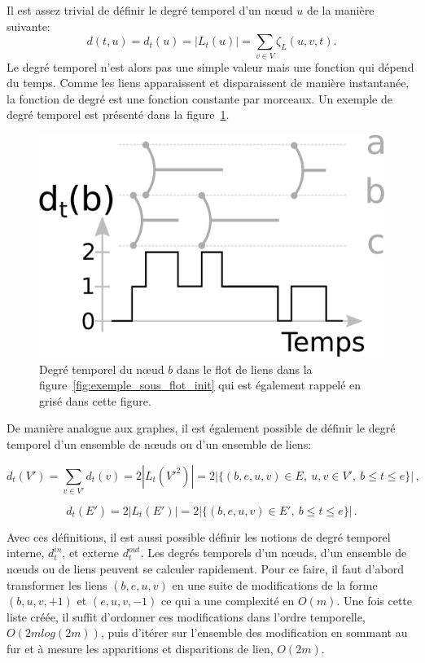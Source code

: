 Il est assez trivial de définir le degré temporel d'un n\oe ud $u$ de la manière suivante:
\begin{equation}
d(t,u)=d_t(u)= |L_t(u)|= \sum_{v \in V} \zeta_{L}(u,v,t).
\end{equation}
Le degré temporel n'est alors pas une simple valeur mais une fonction qui dépend du temps.
Comme les liens apparaissent et disparaissent de manière instantanée, la fonction de degré est une fonction constante par morceaux.
Un exemple de degré temporel est présenté dans la figure~\ref{fig:exemple_degre}.

\begin{figure}
\centering
\includegraphics[width=0.5\linewidth]{img/Intro/degre2.eps}
\caption{Degré temporel du n\oe ud $b$ dans le flot de liens dans la figure~\ref{fig:exemple_sous_flot_init} qui est également rappelé en grisé dans cette figure.
}
\label{fig:exemple_degre}
\end{figure}

De manière analogue aux graphes, il est également possible de définir le degré temporel d'un ensemble de n\oe uds ou d'un ensemble de liens:

\begin{equation}
d_t(V')= \sum_{v \in V'} d_t(v) = 2 |L_{t}(V'^2)| = 2|\{(b,e,u,v) \in E,\ u,v \in V',\ b \leq t \leq e\}|\,,
\end{equation}

\begin{equation}
d_t(E')=2|L_{t}(E')|= 2|\{(b,e,u,v) \in E',\ b \leq t \leq e\}|\,.
\end{equation}

Avec ces définitions, il est aussi possible définir les notions de degré temporel interne, $d_t^{in}$, et externe $d_t^{out}$.
Les degrés temporels d'un n\oe uds, d'un ensemble de n\oe uds ou de liens peuvent se calculer rapidement.
Pour ce faire, il faut d'abord transformer les liens $(b,e,u,v)$ en une suite de modifications de la forme $(b,u,v,+1)$ et $(e,u,v,-1)$ ce qui a une complexité en $O(m)$.
Une fois cette liste créée, il suffit d'ordonner ces modifications dans l'ordre temporelle, $O(2mlog(2m))$, puis d'itérer sur l'ensemble des modification en sommant au fur et à mesure les apparitions et disparitions de lien, $O(2m)$.
\bigskip

